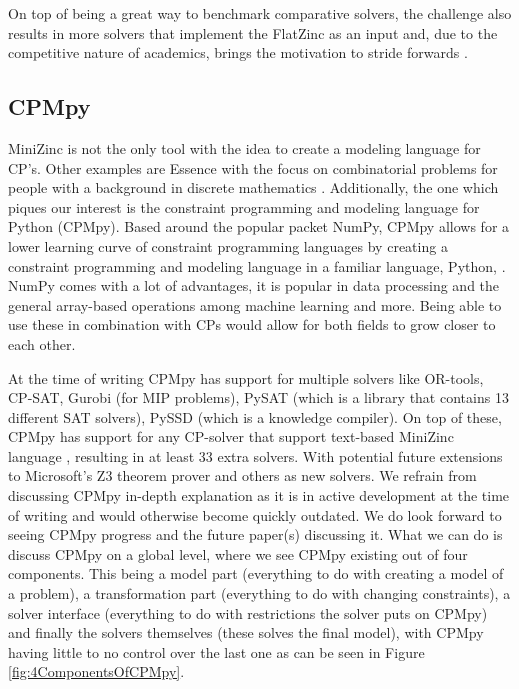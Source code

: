 On top of being a great way to benchmark comparative solvers, the challenge also results in more solvers that implement the FlatZinc as an input and, due to the competitive nature of academics, brings the motivation to stride forwards \cite{59stuckey2010philosophy}.

\subsection{CPMpy}
\label{CP:CPMpy}
MiniZinc is not the only tool with the idea to create a modeling language for CP’s. Other examples are Essence with the focus on combinatorial problems for people with a background in discrete mathematics \cite{70frisch2008essence}.
Additionally, the one which piques our interest is the constraint programming and modeling language for Python (CPMpy). Based around the popular packet NumPy, CPMpy allows for a lower learning curve of constraint programming languages by creating a constraint programming and modeling language in a familiar language, Python, \cite{17guns2019increasing}. NumPy comes with a lot of advantages, it is popular in data processing and the general array-based operations among machine learning and more. 
Being able to use these in combination with CPs would allow for both fields to grow closer to each other. 


At the time of writing CPMpy has support for multiple solvers like OR-tools, CP-SAT, Gurobi (for MIP problems), PySAT (which is a library that contains 13 different SAT solvers), PySSD (which is a knowledge compiler). On top of these, CPMpy has support for any CP-solver that support text-based MiniZinc language \cite{CPMpyDoc, CPMpyGithub}, resulting in at least 33 extra solvers. With potential future extensions to Microsoft’s Z3 theorem prover and others as new solvers. 
We refrain from discussing CPMpy in-depth explanation as it is in active development at the time of writing and would otherwise become quickly outdated.
We do look forward to seeing CPMpy progress and the future paper(s) discussing it. What we can do is discuss CPMpy on a global level, where we see CPMpy existing out of four components. This being a model part (everything to do with creating a model of a problem), a transformation part (everything to do with changing constraints), a solver interface (everything to do with restrictions the solver puts on CPMpy) and finally the solvers themselves (these solves the final model), with CPMpy having little to no control over the last one as can be seen in Figure \ref{fig:4ComponentsOfCPMpy}.

